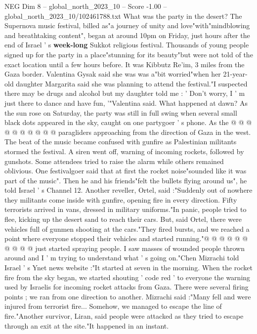 \begin{textsample}{NEG Dim 8 – global\_north\_2023\_10 – Score -1.00 – global\_north\_2023\_10/102461788.txt}  \label{ex:f8_neg_242}
What was the party in the desert?
The Supernova music festival, billed as"a journey of unity and love"with"mindblowing and breathtaking content", began at around 10pm on Friday, just hours after the end of Israel ' s \textbf{week-long} Sukkot religious festival.
Thousands of young people signed up for the party in a place"stunning for its beauty"but were not told of the exact location until a few hours before.
It was Kibbutz Re'im, 3 miles from the Gaza border.
Valentina Gysak said she was was a"bit worried"when her 21-year-old daughter Margarita said she was planning to attend the festival."I suspected there may be drugs and alcohol but my daughter told me : ' Don't worry, I ' m just there to dance and have fun, '"Valentina said.
What happened at dawn?
As the sun rose on Saturday, the party was still in full swing when several small black dots appeared in the sky, caught on one partygoer ' s phone.
As the @ @ @ @ @ @ @ @ @ @ paragliders approaching from the direction of Gaza in the west.
The beat of the music became confused with gunfire as Palestinian militants stormed the festival.
A siren went off, warning of incoming rockets, followed by gunshots.
Some attendees tried to raise the alarm while others remained oblivious.
One festivalgoer said that at first the rocket noise"sounded like it was part of the music".
Then he and his friends"felt the bullets flying around us", he told Israel ' s Channel 12.
Another reveller, Ortel, said :"Suddenly out of nowhere they militants come inside with gunfire, opening fire in every direction.
Fifty terrorists arrived in vans, dressed in military uniforms."In panic, people tried to flee, kicking up the desert sand to reach their cars.
But, said Ortel, there were vehicles full of gunmen shooting at the cars."They fired bursts, and we reached a point where everyone stopped their vehicles and started running."@ @ @ @ @ @ @ @ @ @ just started spraying people.
I saw masses of wounded people thrown around and I ' m trying to understand what ' s going on."Chen Mizrachi told Israel ' s Ynet news website :"It started at seven in the morning.
When the rocket fire from the sky began, we started shouting ' code red ' to everyone the warning used by Israelis for incoming rocket attacks from Gaza.
There were several firing points ; we ran from one direction to another.
Mizrachi said :"Many fell and were injured from terrorist fire...
Somehow, we managed to escape the line of fire."Another survivor, Liran, said people were attacked as they tried to escape through an exit at the site."It happened in an instant.

\end{textsample}
